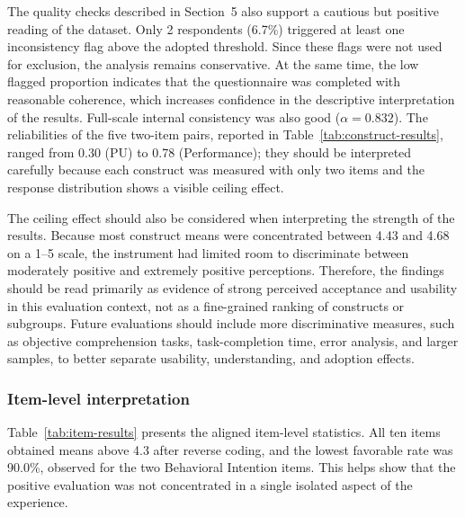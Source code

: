 \documentclass[english]{UNISINOSartigo} %
\begin{document}
The quality checks described in Section~5 also support a cautious but positive reading of the dataset. Only 2 respondents (6.7\%) triggered at least one inconsistency flag above the adopted threshold. Since these flags were not used for exclusion, the analysis remains conservative. At the same time, the low flagged proportion indicates that the questionnaire was completed with reasonable coherence, which increases confidence in the descriptive interpretation of the results. Full-scale internal consistency was also good ($\alpha = 0.832$). The reliabilities of the five two-item pairs, reported in Table~\ref{tab:construct-results}, ranged from 0.30 (PU) to 0.78 (Performance); they should be interpreted carefully because each construct was measured with only two items and the response distribution shows a visible ceiling effect.

The ceiling effect should also be considered when interpreting the strength of the results. Because most construct means were concentrated between 4.43 and 4.68 on a 1--5 scale, the instrument had limited room to discriminate between moderately positive and extremely positive perceptions. Therefore, the findings should be read primarily as evidence of strong perceived acceptance and usability in this evaluation context, not as a fine-grained ranking of constructs or subgroups. Future evaluations should include more discriminative measures, such as objective comprehension tasks, task-completion time, error analysis, and larger samples, to better separate usability, understanding, and adoption effects.

\subsubsection{Item-level interpretation}

Table~\ref{tab:item-results} presents the aligned item-level statistics. All ten items obtained means above 4.3 after reverse coding, and the lowest favorable rate was 90.0\%, observed for the two Behavioral Intention items. This helps show that the positive evaluation was not concentrated in a single isolated aspect of the experience.
\end{document}
